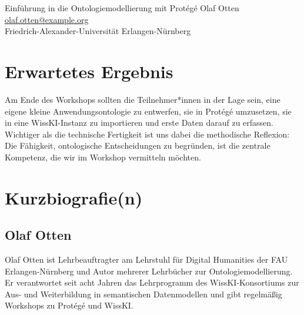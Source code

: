 \begin{beitrag}{Einführung in die Ontologiemodellierung mit Protégé}{%
Olaf Otten\, \\
\small \href{mailto:olaf.otten@example.org}{olaf.otten@example.org} \\
\small Friedrich-Alexander-Universität Erlangen-Nürnberg
}
\section{Erwartetes Ergebnis}
Am Ende des Workshops sollten die Teilnehmer*innen in der Lage sein, eine eigene kleine Anwendungsontologie zu entwerfen, sie in Protégé umzusetzen, sie in eine WissKI-Instanz zu importieren und erste Daten darauf zu erfassen. Wichtiger als die technische Fertigkeit ist uns dabei die methodische Reflexion: Die Fähigkeit, ontologische Entscheidungen zu begründen, ist die zentrale Kompetenz, die wir im Workshop vermitteln möchten.

\end{beitrag}

\section*{Kurzbiografie(n)}

\subsection*{Olaf Otten}
Olaf Otten ist Lehrbeauftragter am Lehrstuhl für Digital Humanities der FAU Erlangen-Nürnberg und Autor mehrerer Lehrbücher zur Ontologiemodellierung. Er verantwortet seit acht Jahren das Lehrprogramm des WissKI-Konsortiums zur Aus- und Weiterbildung in semantischen Datenmodellen und gibt regelmäßig Workshops zu Protégé und WissKI.

